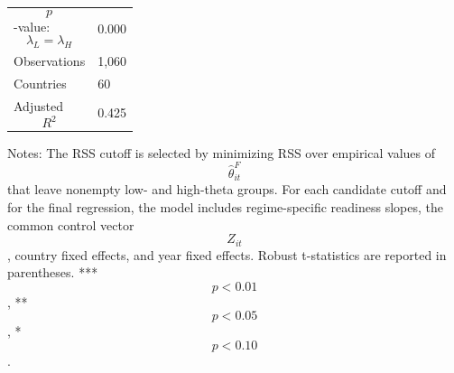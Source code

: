 \begin{table}[H]
\begin{threeparttable}
\begin{tabularx}{\textwidth}{lY}
$$p$$-value: $$\lambda_L=\lambda_H$$ & 0.000 \\
Observations & 1,060 \\
Countries & 60 \\
Adjusted $$R^2$$ & 0.425 \\
\bottomrule
\end{tabularx}
\begin{tablenotes}[flushleft]\footnotesize
\item Notes: The RSS cutoff is selected by minimizing RSS over empirical values of $$\widehat{\theta}^{F}_{it}$$ that leave nonempty low- and high-theta groups. For each candidate cutoff and for the final regression, the model includes regime-specific readiness slopes, the common control vector $$Z_{it}$$, country fixed effects, and year fixed effects. Robust t-statistics are reported in parentheses. *** $$p<0.01$$, ** $$p<0.05$$, * $$p<0.10$$.
\end{tablenotes}
\end{threeparttable}
\end{table}
